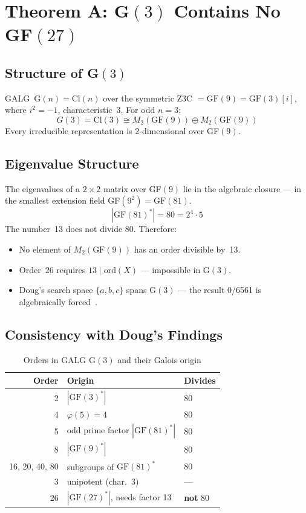 \section{Theorem A: G$(3)$ Contains No GF$(27)$}

\subsection{Structure of G$(3)$}

GALG~G$(n) = \text{Cl}(n)$ over the symmetric Z3C $= \text{GF}(9) = \text{GF}(3)[i]$,
where $i^2 = -1$, characteristic~3.
For odd $n = 3$:
\begin{equation}
  G(3) = \text{Cl}(3) \cong M_2(\text{GF}(9)) \oplus M_2(\text{GF}(9))
\end{equation}
Every irreducible representation is 2-dimensional over GF$(9)$.

\subsection{Eigenvalue Structure}

The eigenvalues of a $2 \times 2$ matrix over GF$(9)$ lie in the
algebraic closure --- in the smallest extension field
GF$(9^2) = \text{GF}(81)$.
\begin{equation}
  |\text{GF}(81)^*| = 80 = 2^4 \cdot 5
\end{equation}
The number~13 does not divide 80. Therefore:
\begin{itemize}
  \item No element of $M_2(\text{GF}(9))$ has an order divisible by~13.
  \item Order~26 requires $13 \mid \text{ord}(X)$ --- impossible in G$(3)$.
  \item Doug's search space $\{a, b, c\}$ spans G$(3)$ --- the result 0/6561 is algebraically forced~\BM.
\end{itemize}

\subsection{Consistency with Doug's Findings}

\begin{table}[H]
\centering
\caption{Orders in GALG G$(3)$ and their Galois origin}
\begin{tabular}{rll}
\toprule
Order & Origin & Divides \\
\midrule
2 & $|\text{GF}(3)^*|$ & 80 \\
4 & $\varphi(5) = 4$ & 80 \\
5 & odd prime factor $|\text{GF}(81)^*|$ & 80 \\
8 & $|\text{GF}(9)^*|$ & 80 \\
16, 20, 40, 80 & subgroups of $\text{GF}(81)^*$ & 80 \\
3 & unipotent (char.\ 3) & --- \\
26 & $|\text{GF}(27)^*|$, needs factor 13 & \textbf{not} 80 \\
\bottomrule
\end{tabular}
\end{table}

